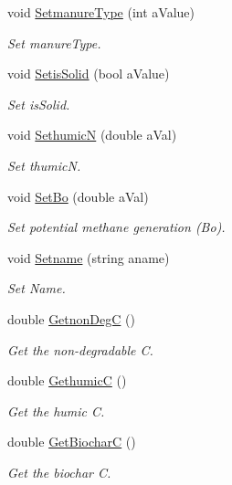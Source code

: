 \begin{DoxyCompactItemize}
void \mbox{\hyperlink{classmanure_a26e535fe83dcbe7265e6c7c235ac2b90}{Setmanure\+Type}} (int a\+Value)
\begin{DoxyCompactList}\small\item\em Set manure\+Type. \end{DoxyCompactList}\item 
void \mbox{\hyperlink{classmanure_ab68f8bc5fee94481bf040a4f7df91fdb}{Setis\+Solid}} (bool a\+Value)
\begin{DoxyCompactList}\small\item\em Set is\+Solid. \end{DoxyCompactList}\item 
void \mbox{\hyperlink{classmanure_a1f1fbd38710b993c9577049b2df3f51b}{SethumicN}} (double a\+Val)
\begin{DoxyCompactList}\small\item\em Set thumicN. \end{DoxyCompactList}\item 
void \mbox{\hyperlink{classmanure_a05f0baca8b6fcef8b2bf465cf11a50ab}{Set\+Bo}} (double a\+Val)
\begin{DoxyCompactList}\small\item\em Set potential methane generation (Bo). \end{DoxyCompactList}\item 
void \mbox{\hyperlink{classmanure_a08832556f75468f91453b8ee5f855abc}{Setname}} (string aname)
\begin{DoxyCompactList}\small\item\em Set Name. \end{DoxyCompactList}\item 
double \mbox{\hyperlink{classmanure_a601fb991bbe947332a7a55a15ff352ba}{Getnon\+DegC}} ()
\begin{DoxyCompactList}\small\item\em Get the non-\/degradable C. \end{DoxyCompactList}\item 
double \mbox{\hyperlink{classmanure_a8faaa73025550e7623695f40ee9033ea}{GethumicC}} ()
\begin{DoxyCompactList}\small\item\em Get the humic C. \end{DoxyCompactList}\item 
double \mbox{\hyperlink{classmanure_a022ab5816bf0c566ce47f71641834531}{Get\+BiocharC}} ()
\begin{DoxyCompactList}\small\item\em Get the biochar C. \end{DoxyCompactList}\item 

\end{DoxyCompactItemize}
